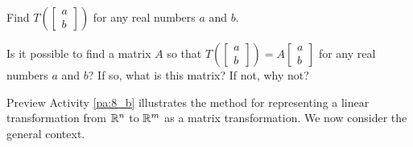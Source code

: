 \begin{pa}
	\item Find $T\left(\left[ \begin{array}{c} a \\ b \end{array} \right] \right)$ for any real numbers $a$ and $b$.


	\item Is it possible to find a matrix $A$ so that $T\left(\left[ \begin{array}{c} a \\ b \end{array} \right] \right) = A \left[ \begin{array}{c} a \\ b \end{array} \right]$ for any real numbers $a$ and $b$? If so, what is this matrix? If not, why not?


	\ee

\end{pa}

\label{sec:trans_rn_rm}

Preview Activity \ref{pa:8_b} illustrates the method for representing a linear transformation from $\mathbb{R}^n$ to $\mathbb{R}^m$ as a matrix transformation. We now consider the general context. 


